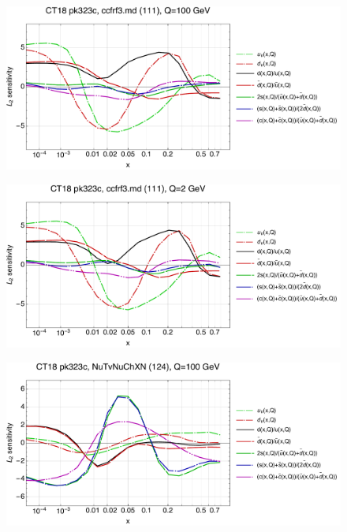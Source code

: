 \documentclass[10pt,aps,prd,floatfix,titlepage]{revtex4}
\begin{document}
\clearpage
\begin{figure}
\includegraphics[width=\textwidth,height=0.44\textheight,keepaspectratio]{2/111_ct18nn_q100_Sf_2.pdf}
\caption{}
\end{figure}
\begin{figure}
\includegraphics[width=\textwidth,height=0.44\textheight,keepaspectratio]{2/111_ct18nn_q2_Sf_2.pdf}
\caption{}
\end{figure}
\clearpage
\begin{figure}
\includegraphics[width=\textwidth,height=0.44\textheight,keepaspectratio]{2/124_ct18nn_q100_Sf_2.pdf}
\caption{}
\end{figure}
\end{document}
